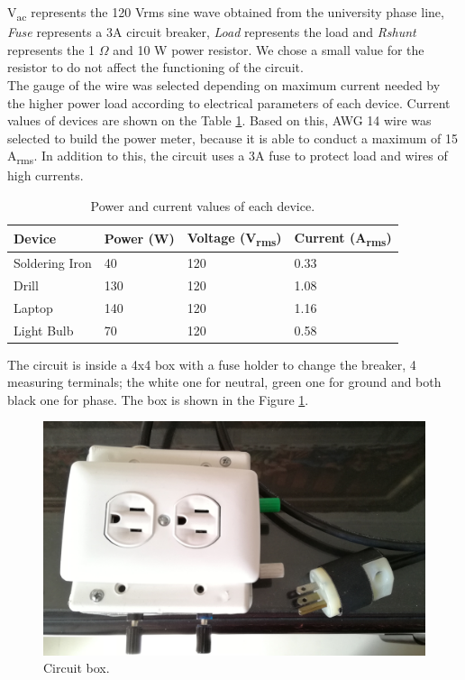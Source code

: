 \documentclass[journal]{IEEEtran}
\begin{document}
V\textsubscript{ac} represents the 120 Vrms sine wave 
obtained from the university phase line, \textit{Fuse}
represents a 3A circuit breaker, \textit{Load} represents 
the load and \textit{Rshunt} 
represents the 1 $\Omega$ and 10 W 
power resistor. We chose a small value for the resistor 
to do not affect the functioning of the circuit. \\

The gauge of the wire was selected depending on maximum 
current needed by the higher power load according to 
electrical parameters 
of each device. Current values of devices are 
shown on the Table \ref{current_table}. Based on this, 
AWG 14 wire was selected to build the power meter, because 
it is able to conduct a maximum of 15 A\textsubscript{rms}.
In addition to this, the circuit uses a 3A fuse to protect
load and wires of high currents.\\

\begin{table}
\centering
\caption{Power and current values of each device.}
\begin{tabular}{|l|p{1.2cm}|p{1.5cm}|p{1.5cm}|}
\hline 
Device & Power (W) & Voltage (V\textsubscript{rms}) 
& Current (A\textsubscript{rms}) \\ \hline 
Soldering Iron 	&  40	& 120 	& 0.33 \\ \hline 
Drill 		& 130	& 120   & 1.08 \\ \hline 
Laptop 		& 140 	& 120   & 1.16 \\ \hline 
Light Bulb		& 70  	& 120   & 0.58 \\ \hline 
\end{tabular}
\label{current_table}
\end{table}

The circuit is inside a 4x4 box with a fuse holder to 
change the breaker, 4 measuring terminals; the white 
one for neutral, green one for ground and 
both black one for phase. The box is shown in the 
Figure \ref{circuit_box}. \\

\begin{figure}[h]
\centering
\includegraphics[clip,width=\columnwidth]{circuit_box.png}
\caption{Circuit box.}
\label{circuit_box}
\end{figure}
\end{document}
